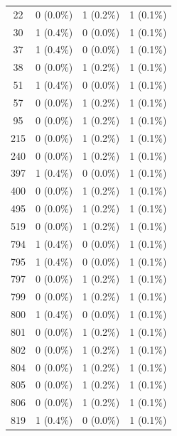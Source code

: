 \documentclass{article}
\begin{document}
\begin{table}[hbt!]
{\begin{tabular}{cccc}
22   & 0 (0.0\%)       & 1 (0.2\%)          & 1 (0.1\%)     \\
30   & 1 (0.4\%)       & 0 (0.0\%)          & 1 (0.1\%)     \\
37   & 1 (0.4\%)       & 0 (0.0\%)          & 1 (0.1\%)     \\
38   & 0 (0.0\%)       & 1 (0.2\%)          & 1 (0.1\%)     \\
51   & 1 (0.4\%)       & 0 (0.0\%)          & 1 (0.1\%)     \\
57   & 0 (0.0\%)       & 1 (0.2\%)          & 1 (0.1\%)     \\
95   & 0 (0.0\%)       & 1 (0.2\%)          & 1 (0.1\%)     \\
215  & 0 (0.0\%)       & 1 (0.2\%)          & 1 (0.1\%)     \\
240  & 0 (0.0\%)       & 1 (0.2\%)          & 1 (0.1\%)     \\
397  & 1 (0.4\%)       & 0 (0.0\%)          & 1 (0.1\%)     \\
400  & 0 (0.0\%)       & 1 (0.2\%)          & 1 (0.1\%)     \\
495  & 0 (0.0\%)       & 1 (0.2\%)          & 1 (0.1\%)     \\
519  & 0 (0.0\%)       & 1 (0.2\%)          & 1 (0.1\%)     \\
794  & 1 (0.4\%)       & 0 (0.0\%)          & 1 (0.1\%)     \\
795  & 1 (0.4\%)       & 0 (0.0\%)          & 1 (0.1\%)     \\
797  & 0 (0.0\%)       & 1 (0.2\%)          & 1 (0.1\%)     \\
799  & 0 (0.0\%)       & 1 (0.2\%)          & 1 (0.1\%)     \\
800  & 1 (0.4\%)       & 0 (0.0\%)          & 1 (0.1\%)     \\
801  & 0 (0.0\%)       & 1 (0.2\%)          & 1 (0.1\%)     \\
802  & 0 (0.0\%)       & 1 (0.2\%)          & 1 (0.1\%)     \\
804  & 0 (0.0\%)       & 1 (0.2\%)          & 1 (0.1\%)     \\
805  & 0 (0.0\%)       & 1 (0.2\%)          & 1 (0.1\%)     \\
806  & 0 (0.0\%)       & 1 (0.2\%)          & 1 (0.1\%)     \\
819  & 1 (0.4\%)       & 0 (0.0\%)          & 1 (0.1\%)    
\end{tabular}%
}
\end{table}
\end{document}
